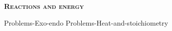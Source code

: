 \documentclass[main.tex]{subfiles}
\newcommand\chapterlabel{Ch-thermochemistry}
\begin{document}
\begin{multicols*}{2}
{\raggedright\textsc{\textbf{Reactions and energy }}\par}
{Problems-Exo-endo} 
{Problems-Heat-and-stoichiometry} 



\iftoggle{chem121}{}{
{\raggedright\textsc{\textbf{Enthalpy }}\par}

{Problems-Enthalpy-table} 
{\raggedright\textsc{\textbf{Hess's Law }}\par} 
{Problems-Hess-law} 
}











\end{multicols*} \iftoggle{showfinalanswers}{
\newpage\fancyhfoffset[E,O]{0pt}
\begin{answerbox}
\begin{answersenvironment}
 \begin{localsize}{10}
{ \checkoddpage\ifoddpage    \else   \clearpage\thispagestyle{empty}\mbox{}\clearpage\fi
\Large \bf Answers}
\SetupExSheets{ headings = inline-nr , counter-format = qu) ,}
\printsolutions 
  \vspace{20cm}
 \end{localsize}
 \end{answersenvironment}
\end{answerbox}
}{}
\checkoddpage\ifoddpage   \clearpage\thispagestyle{empty}\mbox{}\clearpage \else   \fi
\end{document}
